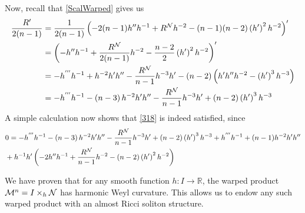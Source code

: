 \begin{demm}
\begin{equation}
            \end{equation}
            Now, recall that \cref{ScalWarped} gives us
            \begin{equation*}
                \begin{aligned}
                    \frac{R'}{2(n-1)} &= \frac{1}{2(n-1)} \left(-2(n-1)h''h^{-1} + R^{\mathcal{N}} h^{-2} - (n-1)(n-2) \left(h'\right)^2 h^{-2}\right)' \\
                    &=\left(-h'' h^{-1} + \frac{R^{\mathcal{N}}}{2(n-1)} h^{-2} - \frac{n-2}{2} \left(h'\right)^{2} h^{-2}\right)' \\
                    &=-h^{'''} h^{-1} +h^{-2}  h' h''  - \frac{R^{\mathcal{N}}}{n-1} h^{-3} h' - \left(n-2\right) \left(h'h'' h^{-2} - \left(h'\right)^3 h^{-3}\right) \\
                    &= -h^{'''} h^{-1} - \left(n-3\right)h^{-2}  h' h''- \frac{R^{\mathcal{N}}}{n-1} h^{-3} h' + \left(n-2\right) \left(h'\right)^3 h^{-3}
                \end{aligned}
            \end{equation*}
            A simple calculation now shows that \cref{318} is indeed satisfied, since
            \begin{equation*}
                \begin{aligned}
                    &0=-h^{'''} h^{-1} - \left(n-3\right)h^{-2}  h' h''- \frac{R^{\mathcal{N}}}{n-1} h^{-3} h' + \left(n-2\right) \left(h'\right)^3 h^{-3}  + h^{'''}h^{-1} + (n-1)h^{-2}h'  h'' \\
                    &+ h^{-1} h' \left(-2 h''h^{-1} + \frac{R^{\mathcal{N}}}{n-1} h^{-2} - (n-2) \left(h'\right)^2 h^{-2}\right) 
                \end{aligned}
            \end{equation*}
            
        \end{demm}


        We have proven that for any smooth function $h: I \to \mathbb{R}$, the warped product $\mathcal{M}^n = I \times_{h} \mathcal{N}$ has harmonic Weyl curvature. This allows us to endow any such warped product with an almost Ricci soliton structure.\\



